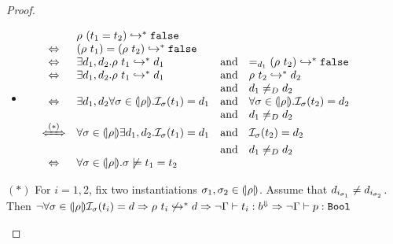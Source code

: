 \begin{proof}
\begin{itemize}
\begin{itemize}
\item
$
\begin{array}{lclclcl}
	&&\evals{\rho\ (t_1 = t_2)}{\efalse} \\&\Leftrightarrow&
	\evals{(\rho\ t_1) = (\rho\ t_2)}{\efalse} &&\\
	&\Leftrightarrow&
	\exists d_1, d_2.\evals{\rho\ t_1}{d_1} &\text{and}& \evals{=_{d_1} (\rho\ t_2)}{\efalse} &\\
	&\Leftrightarrow&
	\exists d_1, d_2.\evals{\rho\ t_1}{d_1} &\text{and}& \evals{\rho\ t_2}{d_2} \\&&&\text{and}& d_1 \not=_D d_2\\
	&\Leftrightarrow&
	\exists d_1, d_2\forall\sigmamodel\in\instance{\rho}.\interpIEq{\sigmamodel}{t_1}{d_1} &\text{and}& 
	\forall\sigmamodel\in\instance{\rho}.\interpIEq{\sigmamodel}{t_2}{d_2} \\&&&\text{and}& d_1 \not =_D d_2\\
	&\xLeftrightarrow{(*)}&
	\forall\sigmamodel\in\instance{\rho}\exists d_1, d_2.\interpIEq{\sigmamodel}{t_1}{d_1} &\text{and}& 
	\interpIEq{\sigmamodel}{t_2}{d_2} \\&&&\text{and}& d_1 \not =_D d_2\\
	&\Leftrightarrow&
	\forall\sigmamodel\in \instance{\rho}. \sigmamodel \not \models t_1 = t_2  &&\\
\end{array}
$
\end{itemize}
$(*)$ For $i = 1 , 2$, fix two instantiations
$\sigma_1, \sigma_2\in(\!|\rho|\!)$. 
Assume that $d_{i_{\sigma_1}} \not = d_{i_{\sigma_2}}$.
Then $\lnot \forall \sigma\in(\!|\rho|\!) \mathcal{I}_{\sigma}(t_i) = d \Rightarrow \rho\ t_i \not \hookrightarrow_{}^{*} d \Rightarrow \lnot \Gamma \vdash t_i : b^{\Downarrow} \Rightarrow \lnot \Gamma \vdash p : \mathtt{Bool}$


\end{itemize}
\end{proof}
